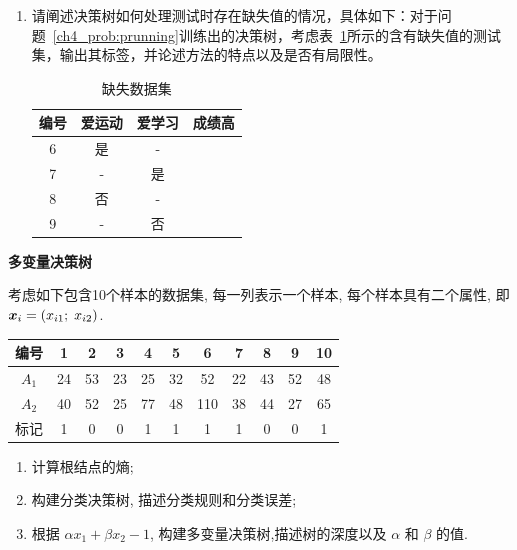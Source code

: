\documentclass[answers]{exam}  %
\begin{document}
\begin{questions}
\begin{enumerate}
    \item 请阐述决策树如何处理测试时存在缺失值的情况，具体如下：对于问题~\ref{ch4_prob:prunning}训练出的决策树，考虑表~\ref{ch4_tab:artificial_testing_dataset2}所示的含有缺失值的测试集，输出其标签，并论述方法的特点以及是否有局限性。
          \begin{table}[ht]
            \centering
            \caption{缺失数据集}\label{ch4_tab:artificial_testing_dataset2}
            \begin{tabular}{cccc}
              \hline 编号 & 爱运动 & 爱学习 & 成绩高 \\
              \hline 6    & 是     & -      &        \\
              7           & -      & 是     &        \\
              8           & 否     & -      &        \\
              9           & -      & 否     &        \\
              \hline
            \end{tabular}
          \end{table}

  \end{enumerate}
  \begin{solution}
  \end{solution}


  \question [20] \textbf{多变量决策树}

  考虑如下包含10个样本的数据集, 每一列表示一个样本, 每个样本具有二个属性, 即${\boldsymbol{x}}_i = (x_{i1};\; x_{i2})$.
  \begin{table}[ht]
    \begin{center}
      \begin{tabular}{ccccccccccc}
        \hline 编号  & 1  & 2  & 3  & 4  & 5  & 6   & 7  & 8  & 9  & 10 \\
        \hline $A_1$ & 24 & 53 & 23 & 25 & 32 & 52  & 22 & 43 & 52 & 48 \\
        $A_2$        & 40 & 52 & 25 & 77 & 48 & 110 & 38 & 44 & 27 & 65 \\
        \hline 标记  & 1  & 0  & 0  & 1  & 1  & 1   & 1  & 0  & 0  & 1  \\
        \hline
      \end{tabular}
    \end{center}
  \end{table}
  \begin{enumerate}
    \item 计算根结点的熵;
    \item 构建分类决策树, 描述分类规则和分类误差;
    \item 根据 $\alpha x_{1}+\beta x_{2}-1$,  构建多变量决策树,描述树的深度以及 $\alpha$ 和 $\beta$ 的值.
  \end{enumerate}
  \begin{solution}
  \end{solution}

\end{questions}
\end{document}
